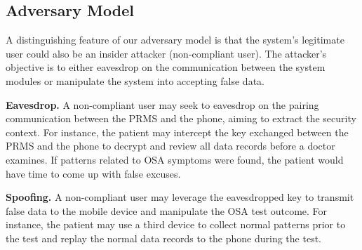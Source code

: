 \subsection{Adversary Model}
A distinguishing feature of our adversary model is that the system's legitimate user could also be an insider attacker (non-compliant user). The attacker's objective is to either eavesdrop on the communication between the system modules or manipulate the system into accepting false data.

\textbf{Eavesdrop.} A non-compliant user may seek to eavesdrop on the pairing communication between the PRMS and the phone, aiming to extract the security context. For instance, the patient may intercept the key exchanged between the PRMS and the phone to decrypt and review all data records before a doctor examines. If patterns related to OSA symptoms were found, the patient would have time to come up with false excuses.

\textbf{Spoofing.} A non-compliant user may leverage the eavesdropped key to transmit false data to the mobile device and manipulate the OSA test outcome. For instance, the patient may use a third device to collect normal patterns prior to the test and replay the normal data records to the phone during the test.




